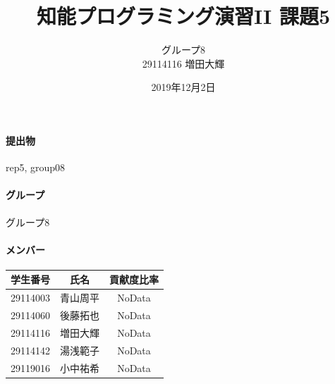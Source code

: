 \documentclass[uplatex,12pt]{jsarticle}
\title{知能プログラミング演習II 課題5}
\author{グループ8\\
  29114116 増田大輝\\
}
\date{2019年12月2日}
\begin{document}
\maketitle

\paragraph{提出物} rep5, group08
\paragraph{グループ} グループ8

\paragraph{メンバー}
\begin{tabular}{|c|c|c|}
  \hline
  学生番号&氏名&貢献度比率\\
  \hline\hline
  29114003&青山周平&NoData\\
  \hline
  29114060&後藤拓也&NoData\\
  \hline
  29114116&増田大輝&NoData\\
  \hline
  29114142&湯浅範子&NoData\\
  \hline
  29119016&小中祐希&NoData\\
  \hline
\end{tabular}
\end{document}
